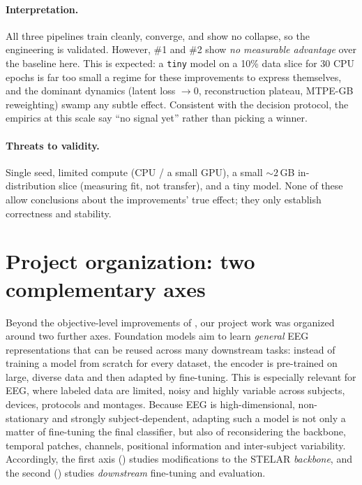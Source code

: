 \documentclass[11pt]{article}
\begin{document}
\paragraph{Interpretation.} All three pipelines train cleanly, converge, and show
no collapse, so the engineering is validated. However, \#1 and \#2 show \emph{no
measurable advantage} over the baseline here. This is expected: a \texttt{tiny}
model on a 10\% data slice for 30 CPU epochs is far too small a regime for these
improvements to express themselves, and the dominant dynamics (latent loss
\(\to 0\), reconstruction plateau, MTPE-GB reweighting) swamp any subtle effect.
Consistent with the decision protocol, the empirics at this scale say
``no signal yet'' rather than picking a winner.

\paragraph{Threats to validity.} Single seed, limited compute (CPU / a small
GPU), a small \(\sim\!2\)\,GB in-distribution slice (measuring fit, not transfer),
and a tiny model. None of these allow conclusions about the improvements' true
effect; they only establish correctness and stability.

\section{Project organization: two complementary axes}
\label{sec:axes}

Beyond the objective-level improvements of , our project
work was organized around two further axes. Foundation models aim to learn
\emph{general} EEG representations that can be reused across many downstream
tasks: instead of training a model from scratch for every dataset, the encoder is
pre-trained on large, diverse data and then adapted by fine-tuning. This is
especially relevant for EEG, where labeled data are limited, noisy and highly
variable across subjects, devices, protocols and montages. Because EEG is
high-dimensional, non-stationary and strongly subject-dependent, adapting such a
model is not only a matter of fine-tuning the final classifier, but also of
reconsidering the backbone, temporal patches, channels, positional information
and inter-subject variability. Accordingly, the first axis
() studies modifications to the STELAR \emph{backbone}, and
the second () studies \emph{downstream} fine-tuning and
evaluation.
\end{document}

